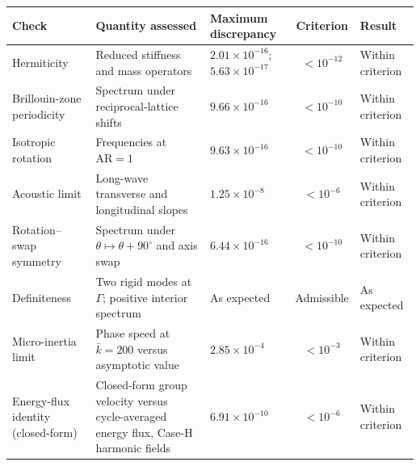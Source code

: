 \begin{tabular}{@{}p{2.3cm} p{6.4cm} p{2.2cm} c p{1.8cm}@{}}
\toprule
Check & Quantity assessed & Maximum discrepancy & Criterion & Result \\
\midrule
Hermiticity & Reduced stiffness and mass operators & $2.01\times10^{-16}$; $5.63\times10^{-17}$ & $<10^{-12}$ & Within criterion \\
Brillouin-zone periodicity & Spectrum under reciprocal-lattice shifts & $9.66\times10^{-16}$ & $<10^{-10}$ & Within criterion \\
Isotropic rotation & Frequencies at $\mathrm{AR}=1$ & $9.63\times10^{-16}$ & $<10^{-10}$ & Within criterion \\
Acoustic limit & Long-wave transverse and longitudinal slopes & $1.25\times10^{-8}$ & $<10^{-6}$ & Within criterion \\
Rotation--swap symmetry & Spectrum under $\theta\mapsto\theta+90^\circ$ and axis swap & $6.44\times10^{-16}$ & $<10^{-10}$ & Within criterion \\
Definiteness & Two rigid modes at $\Gamma$; positive interior spectrum & As expected & Admissible & As expected \\
Micro-inertia limit & Phase speed at $\bar{k}=200$ versus asymptotic value & $2.85\times10^{-4}$ & $<10^{-3}$ & Within criterion \\
Energy-flux identity (closed-form) & Closed-form group velocity versus cycle-averaged energy flux, Case-H harmonic fields & $6.91\times10^{-10}$ & $<10^{-6}$ & Within criterion \\
\bottomrule
\end{tabular}
